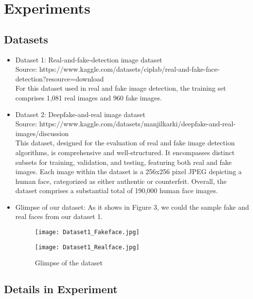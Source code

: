 \documentclass[rebuttal]{cvpr}
\begin{document}
\section{Experiments}
\subsection{Datasets}
\begin{itemize}
    \item Dataset 1: Real-and-fake-detection image dataset  \\
    Source: https://www.kaggle.com/datasets/ciplab/real-and-fake-face-detection?resource=download \\
    For this dataset used in real and fake image detection, the training set comprises 1,081 real images and 960 fake images.
    \item Dataset 2: Deepfake-and-real image dataset  \\
    Source: https://www.kaggle.com/datasets/manjilkarki/deepfake-and-real-images/discussion \\
    This dataset, designed for the evaluation of real and fake image detection algorithms, is comprehensive and well-structured. It encompasses distinct subsets for training, validation, and testing, featuring both real and fake images. Each image within the dataset is a 256x256 pixel JPEG depicting a human face, categorized as either authentic or counterfeit. Overall, the dataset comprises a substantial total of 190,000 human face images.

    \item Glimpse of our dataset: As it shows in Figure 3, we could the sample fake and real faces from our dataset 1.
    
\begin{figure*}[t]
\centering
\begin{minipage}{0.45\linewidth}
   \texttt{[image: Dataset1\_Fakeface.jpg]}
   \label{fig:image1}
\end{minipage}
\hfill
\begin{minipage}{0.45\linewidth}
   \texttt{[image: Dataset1\_Realface.jpg]}
   \label{fig:image2}
\end{minipage}
\caption{Glimpse of the dataset}
\label{fig:dataset}
\end{figure*}
\end{itemize}


\subsection{Details in Experiment}
\end{document}
